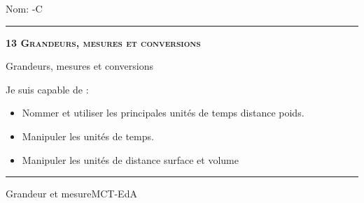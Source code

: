 \documentclass[11pt,a4paper]{article}
\begin{document}
\begin{titlepage}
    \setlength{\topskip}{0mm}
Nom: \hfill \the\year-C
\vspace{0.5cm}
\hrule

    \centering
    \vspace{0.1\textheight}
	{\bfseries\scshape\Huge 13 Grandeurs, mesures et conversions\par}
    \vspace{1.5cm}

    {\huge Grandeurs, mesures et conversions}
	\vspace{1.5cm}
    
    {\large Je suis capable de :}
    \vspace{1.5cm}
    \begin{itemize}
\item Nommer et utiliser les principales unités de temps distance poids.
\item Manipuler les unités de temps.
\item Manipuler les unités de distance surface et volume\end{itemize}

\vfill
\hrule
\vspace{0.5cm}
Grandeur et mesure\hfill MCT-EdA

\end{titlepage}
\end{document}
